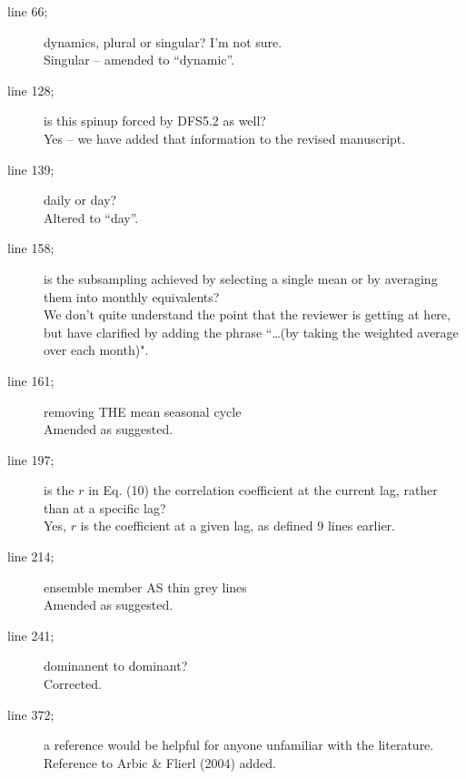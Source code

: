 \documentclass[11pt]{article}
\begin{document}
{\color{blue} 
\begin{description}
\item[line 66;] dynamics, plural or singular? I'm not sure.\\
{\color{black} Singular -- amended to ``dynamic''. }

\item[line 128;] is this spinup forced by DFS5.2 as well?\\
{\color{black} Yes -- we have added that information to the revised manuscript. }

\item[line 139;] daily or day?\\
{\color{black} Altered to ``day''.}

\item[line 158;] is the subsampling achieved by selecting a single mean or by averaging them into monthly equivalents?\\
{\color{black} We don't quite understand the point that the reviewer is getting at here, but have clarified by adding the phrase ``\ldots   (by taking the weighted average over each month)". }

\item[line 161;] removing THE mean seasonal cycle\\
{\color{black} Amended as suggested.}

\item[line 197;] is the $r$ in Eq. (10) the correlation coefficient at the current lag, rather than at a specific lag?\\
{\color{black} Yes, $r$ is the coefficient at a given lag, as defined 9 lines earlier. }

\item[line 214;] ensemble member AS thin grey lines\\
{\color{black} Amended as suggested. }

\item[line 241;] dominanent to dominant?\\
{\color{black} Corrected. }

\item[line 372;] a reference would be helpful for anyone unfamiliar with the literature.\\
{\color{black} Reference to Arbic \& Flierl (2004) added. }

\end{description}
}
\end{document}
